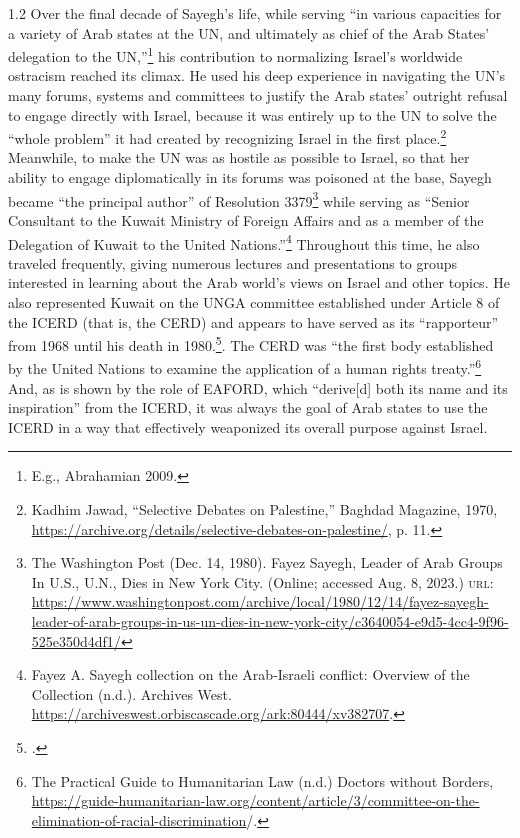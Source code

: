 \documentclass[../unravbook.tex]{subfiles}
\begin{document}
\begin{spacing}{1.2}
Over the final decade of Sayegh's life, while serving ``in various capacities for a variety of Arab states at the UN, and ultimately as chief of the Arab States' delegation to the UN,''\footnote{E.g., Abrahamian 2009.} his contribution to normalizing Israel's worldwide ostracism reached its climax. He used his deep experience in navigating the UN's many forums, systems and committees to justify the Arab states' outright refusal to engage directly with Israel, because it was entirely up to the UN to solve the \enquote{whole problem} it had created by recognizing Israel in the first place.\footnote{Kadhim Jawad, ``Selective Debates on Palestine,'' Baghdad Magazine, 1970, \url{https://archive.org/details/selective-debates-on-palestine/}, p. 11.} Meanwhile, to make the UN was as hostile as possible to Israel, so that her ability to engage diplomatically in its forums was poisoned at the base, Sayegh became ``the principal author'' of Resolution 3379\footnote{The Washington Post (Dec. 14, 1980). Fayez Sayegh, Leader of Arab Groups In U.S., U.N., Dies in New York City. (Online; accessed Aug. 8, 2023.) \textsc{url: } \url{https://www.washingtonpost.com/archive/local/1980/12/14/fayez-sayegh-leader-of-arab-groups-in-us-un-dies-in-new-york-city/c3640054-e9d5-4cc4-9f96-525e350d4df1/}} while serving as ``Senior Consultant to the Kuwait Ministry of Foreign Affairs and as a member of the Delegation of Kuwait to the United Nations.''\footnote{Fayez A. Sayegh collection on the Arab-Israeli conflict:  Overview of the Collection (n.d.). Archives West. \url{https://archiveswest.orbiscascade.org/ark:80444/xv382707}.} Throughout this time, he also traveled frequently, giving numerous lectures and presentations to groups interested in learning about the Arab world's views on Israel and other topics. He also represented Kuwait on the UNGA committee established under Article 8 of the ICERD (that is, the CERD) and appears to have served as its ``rapporteur'' from 1968 until his death in 1980.\footcite[][Sayegh's rapporteur role in CERD  from 1968 until his death in 1970 is also noted without reference to any source in Feldman 2015, 37.]{Sayegh-1982}. The CERD was \enquote{the first body established by the United Nations to examine the application of a human rights treaty.}\footnote{The Practical Guide to Humanitarian Law (n.d.) Doctors without Borders, \url{https://guide-humanitarian-law.org/content/article/3/committee-on-the-elimination-of-racial-discrimination}/.} And, as is shown by the role of EAFORD, which \enquote{derive[d] both its name and its inspiration} from the ICERD, it was always the goal of Arab states to use the ICERD in a way that effectively weaponized its overall purpose against Israel.


\end{spacing}
\end{document}
